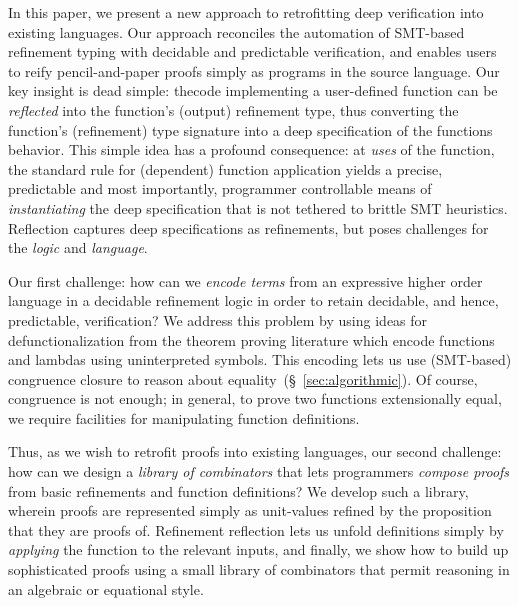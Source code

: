 %
In this paper, we present a new approach to retrofitting
deep verification into existing languages. Our approach
reconciles the automation of SMT-based refinement typing
with decidable and predictable verification, and enables
users to reify pencil-and-paper proofs simply
as programs in the source language.
%
Our key insight is dead simple: the ​code
implementing a​ user-defined function can
be \emph{reflected}​ into the function's
(output) refinement type, thus converting
the function's (refinement) type signature
into a deep specification of the functions
behavior.
%
This simple idea has a profound consequence:
at \emph{uses} of the function, the standard
rule for (dependent) function application
yields a precise, predictable and most
importantly, programmer controllable
means of \emph{instantiating} the deep
specification that is not tethered to
brittle SMT heuristics.
%
Reflection captures deep specifications as
refinements, but poses challenges for the
\emph{logic} and \emph{language}.

%
Our first challenge: how can we \emph{encode terms}
from an expressive higher order language in a decidable
refinement logic in order to retain decidable, and hence,
predictable, verification?
%
We address this problem by using ideas for defunctionalization
from the theorem proving literature which
encode functions and lambdas using uninterpreted symbols.
This encoding lets us use (SMT-based) congruence closure to
reason about equality~(\S~\ref{sec:algorithmic}).
%
Of course, congruence is not enough; in general, \eg to prove
two functions extensionally equal, we require facilities for
manipulating function definitions.

%
Thus, as we wish to retrofit proofs into
existing languages, our second challenge:
how can we design a \emph{library of combinators}
that lets programmers \emph{compose proofs}
from basic refinements and function definitions?
%
We develop such a library, wherein proofs
are represented simply as unit-values
refined by the proposition that they
are proofs of. %
%
Refinement reflection lets us unfold definitions
simply by \emph{applying} the function to the
relevant inputs, and finally, we show how to
build up sophisticated proofs using a small
library of combinators that permit reasoning
in an algebraic or equational style.

